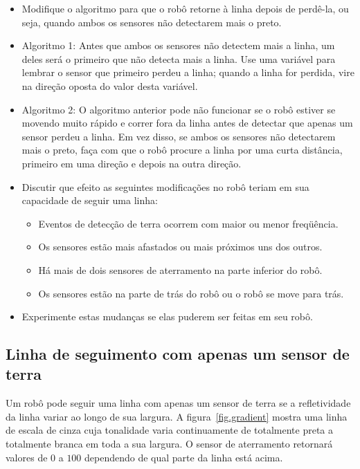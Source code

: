 \begin{framed}
\begin{itemize}
\item Modifique o algoritmo para que o robô retorne à linha depois de perdê-la, ou seja, quando ambos os sensores não detectarem mais o preto.
\item Algoritmo 1: Antes que ambos os sensores não detectem mais a linha, um deles será o primeiro que não detecta mais a linha. Use uma variável para lembrar o sensor que primeiro perdeu a linha; quando a linha for perdida, vire na direção oposta do valor desta variável.
\item Algoritmo 2: O algoritmo anterior pode não funcionar se o robô estiver se movendo muito rápido e correr fora da linha antes de detectar que apenas um sensor perdeu a linha. Em vez disso, se ambos os sensores não detectarem mais o preto, faça com que o robô procure a linha por uma curta distância, primeiro em uma direção e depois na outra direção.
\end{itemize}
\end{framed}

\begin{framed}
\begin{itemize}
\item Discutir que efeito as seguintes modificações no robô teriam em sua capacidade de seguir uma linha:
\begin{itemize}
\item Eventos de detecção de terra ocorrem com maior ou menor freqüência.
\item Os sensores estão mais afastados ou mais próximos uns dos outros.
\item Há mais de dois sensores de aterramento na parte inferior do robô.
\item Os sensores estão na parte de trás do robô ou o robô se move para trás.
\end{itemize}
\item Experimente estas mudanças se elas puderem ser feitas em seu robô.
\end{itemize}
\end{framed}

\subsection{Linha de seguimento com apenas um sensor de terra}

Um robô pode seguir uma linha com apenas um sensor de terra se a refletividade da linha variar ao longo de sua largura. A figura~\ref{fig.gradient} mostra uma linha de escala de cinza cuja tonalidade varia continuamente de totalmente preta a totalmente branca em toda a sua largura. O sensor de aterramento retornará valores de $0$ a $100$ dependendo de qual parte da linha está acima.

